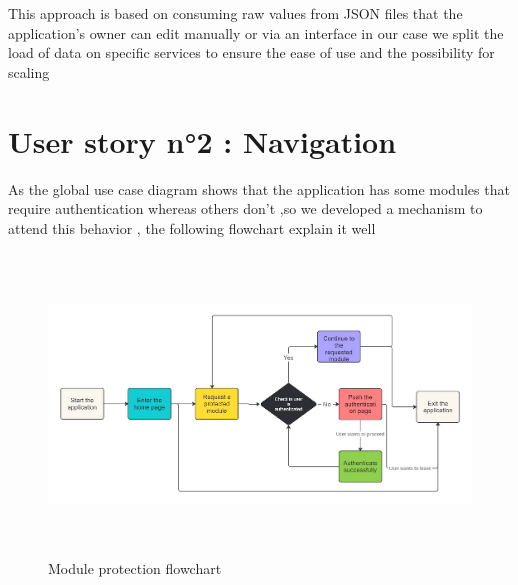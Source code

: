 This approach is based on consuming raw values from JSON files that the application's owner can edit manually or via an interface in our case we split the load of data on specific services to ensure the ease of use  and the possibility for scaling 



\section{User story n°2 : Navigation}
As the global use case diagram shows that the application has some modules that require authentication whereas others don't ,so we developed a mechanism to attend this behavior , the following flowchart explain it well
\begin{figure}[H] \includegraphics[height=8cm]{images/chap2/Pmdl.jpg}
    \caption{Module protection flowchart}
    \label{fig:enter-label}
\end{figure}
\newpage
